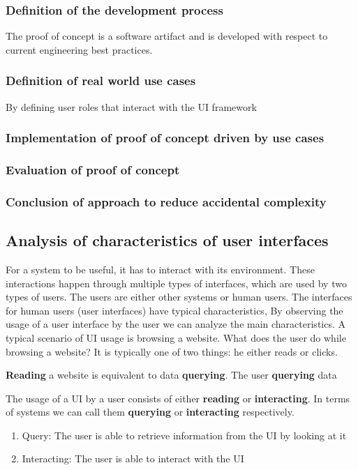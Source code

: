 \subsubsection{Definition of the development process}
The proof of concept is a software artifact and is developed with respect to current engineering best practices.

\subsubsection{Definition of real world use cases}
By defining user roles that interact with the UI framework

\subsubsection{Implementation of proof of concept driven by use cases}
\subsubsection{Evaluation of proof of concept}
\subsubsection{Conclusion of approach to reduce accidental complexity}

\subsection{Analysis of characteristics of user interfaces}
For a system to be useful, it has to interact with its environment. These interactions happen through multiple types of interfaces, which are used by two types of users. The users are either other systems or human users.
The interfaces for human users (user interfaces) have typical characteristics,
By observing the usage of a user interface by the user we can analyze the main characteristics. A typical scenario of UI usage is browsing a website. What does the user do while browsing a website? It is typically one of two things: he either reads or clicks.

\textbf{Reading} a website is equivalent to data \textbf{querying}. The user \textbf{querying} data

The usage of a UI by a user consists of either \textbf{reading} or \textbf{interacting}. In terms of systems we can call them \textbf{querying} or \textbf{interacting} respectively.
\begin{enumerate}
  \item Query: The user is able to retrieve information from the UI by looking at it
  \item Interacting: The user is able to interact with the UI
\end{enumerate}

